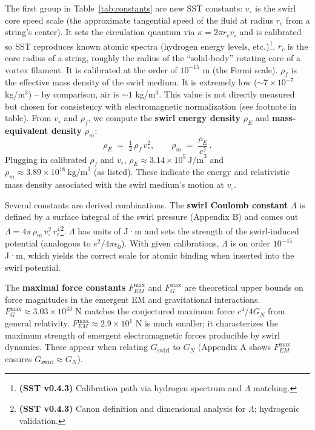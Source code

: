 \documentclass[reprint,aps,onecolumn,nofootinbib]{revtex4-2}
\newcommand{\rhoE}{\rho_{\!E}}                           %
\newcommand{\rhom}{\rho_{\!m}}                           %
\begin{document}
    The first group in Table~\ref{tab:constants} are new SST constants:
    \textbf{$v_{\circ}$} is the swirl core speed scale (the approximate tangential speed of the fluid at radius $r_c$ from a string’s center). It sets the circulation quantum via $\kappa = 2\pi r_c v_{\circ}$ and is calibrated so SST reproduces known atomic spectra (hydrogen energy levels, etc.)\footnote{\textbf{(SST v0.4.3)} Calibration path via hydrogen spectrum and $\Lambda$ matching.}.
    \textbf{$r_c$} is the core radius of a string, roughly the radius of the “solid-body” rotating core of a vortex filament. It is calibrated at the order of $10^{-15}$ m (the Fermi scale).
    \textbf{$\rho_f$} is the effective mass density of the swirl medium. It is extremely low ($\sim\!7\times10^{-7}$ kg/m$^3$) – by comparison, air is $\sim1$ kg/m$^3$. This value is not directly measured but chosen for consistency with electromagnetic normalization (see footnote in table). From $v_{\circ}$ and $\rho_f$, we compute the \textbf{swirl energy density} $\rhoE$ and \textbf{mass-equivalent density} $\rhom$:
    \[
        \rhoE \;=\; \tfrac{1}{2}\,\rho_f\,v_{\circ}^2, \qquad
        \rhom \;=\; \frac{\rhoE}{c^2}\,.
    \]
    Plugging in calibrated $\rho_f$ and $v_{\circ}$, $\rhoE \approx 3.14\times10^{5}~\text{J/m}^3$ and $\rho_m \approx 3.89\times10^{18}~\text{kg/m}^3$ (as listed). These indicate the energy and relativistic mass density associated with the swirl medium’s motion at $v_{\circ}$.

    Several constants are derived combinations. The \textbf{swirl Coulomb constant} $\Lambda$ is defined by a surface integral of the swirl pressure (Appendix B) and comes out $\Lambda = 4\pi\,\rho_m\,v_{\circ}^2\,r_c^4$\footnote{\textbf{(SST v0.4.3)} Canon definition and dimensional analysis for $\Lambda$; hydrogenic validation.}. $\Lambda$ has units of J·m and sets the strength of the swirl-induced potential (analogous to $e^2/4\pi\epsilon_0$). With given calibrations, $\Lambda$ is on order $10^{-45}$ J·m, which yields the correct scale for atomic binding when inserted into the swirl potential.

    The \textbf{maximal force constants} $F_{\!EM}^{\max}$ and $F_{\!G}^{\max}$ are theoretical upper bounds on force magnitudes in the emergent EM and gravitational interactions. $F_{\!G}^{\max}\approx3.03\times10^{43}$ N matches the conjectured maximum force $c^4/4G_N$ from general relativity. $F_{\!EM}^{\max}\approx2.9\times10^1$ N is much smaller; it characterizes the maximum strength of emergent electromagnetic forces producible by swirl dynamics. These appear when relating $G_{\text{swirl}}$ to $G_N$ (Appendix A shows $F_{\!EM}^{\max}$ ensures $G_{\text{swirl}}\approx G_N$).
\end{document}
